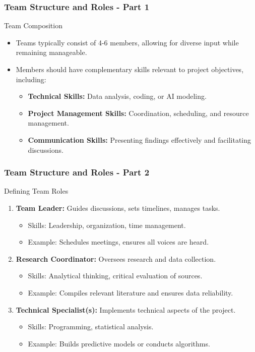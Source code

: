 \documentclass[aspectratio=169]{beamer}
\begin{document}
\begin{frame}[fragile]
    \frametitle{Team Structure and Roles - Part 1}
    \begin{block}{Team Composition}
        \begin{itemize}
            \item Teams typically consist of 4-6 members, allowing for diverse input while remaining manageable.
            \item Members should have complementary skills relevant to project objectives, including:
                \begin{itemize}
                    \item \textbf{Technical Skills:} Data analysis, coding, or AI modeling.
                    \item \textbf{Project Management Skills:} Coordination, scheduling, and resource management.
                    \item \textbf{Communication Skills:} Presenting findings effectively and facilitating discussions.
                \end{itemize}
        \end{itemize}
    \end{block}
\end{frame}

\begin{frame}[fragile]
    \frametitle{Team Structure and Roles - Part 2}
    \begin{block}{Defining Team Roles}
        \begin{enumerate}
            \item \textbf{Team Leader:} Guides discussions, sets timelines, manages tasks.
                \begin{itemize}
                    \item Skills: Leadership, organization, time management.
                    \item Example: Schedules meetings, ensures all voices are heard.
                \end{itemize}
            \item \textbf{Research Coordinator:} Oversees research and data collection.
                \begin{itemize}
                    \item Skills: Analytical thinking, critical evaluation of sources.
                    \item Example: Compiles relevant literature and ensures data reliability.
                \end{itemize}
            \item \textbf{Technical Specialist(s):} Implements technical aspects of the project.
                \begin{itemize}
                    \item Skills: Programming, statistical analysis.
                    \item Example: Builds predictive models or conducts algorithms.
                \end{itemize}
        \end{enumerate}
    \end{block}
\end{frame}
\end{document}
